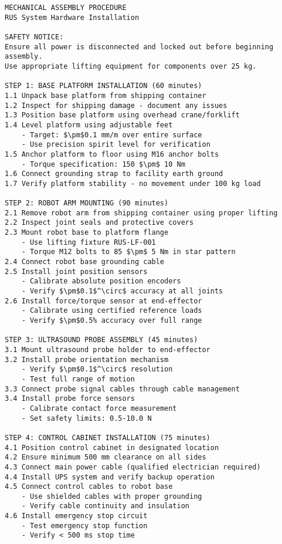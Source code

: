 \begin{lstlisting}[basicstyle=\ttfamily\footnotesize, caption={Step-by-Step Mechanical Assembly}, label={lst:app-mechanical}]
MECHANICAL ASSEMBLY PROCEDURE
RUS System Hardware Installation

SAFETY NOTICE: 
Ensure all power is disconnected and locked out before beginning assembly.
Use appropriate lifting equipment for components over 25 kg.

STEP 1: BASE PLATFORM INSTALLATION (60 minutes)
1.1 Unpack base platform from shipping container
1.2 Inspect for shipping damage - document any issues
1.3 Position base platform using overhead crane/forklift
1.4 Level platform using adjustable feet
    - Target: $\pm$0.1 mm/m over entire surface
    - Use precision spirit level for verification
1.5 Anchor platform to floor using M16 anchor bolts
    - Torque specification: 150 $\pm$ 10 Nm
1.6 Connect grounding strap to facility earth ground
1.7 Verify platform stability - no movement under 100 kg load

STEP 2: ROBOT ARM MOUNTING (90 minutes)
2.1 Remove robot arm from shipping container using proper lifting
2.2 Inspect joint seals and protective covers
2.3 Mount robot base to platform flange
    - Use lifting fixture RUS-LF-001
    - Torque M12 bolts to 85 $\pm$ 5 Nm in star pattern
2.4 Connect robot base grounding cable
2.5 Install joint position sensors
    - Calibrate absolute position encoders
    - Verify $\pm$0.1$^\circ$ accuracy at all joints
2.6 Install force/torque sensor at end-effector
    - Calibrate using certified reference loads
    - Verify $\pm$0.5% accuracy over full range

STEP 3: ULTRASOUND PROBE ASSEMBLY (45 minutes)
3.1 Mount ultrasound probe holder to end-effector
3.2 Install probe orientation mechanism
    - Verify $\pm$0.1$^\circ$ resolution
    - Test full range of motion
3.3 Connect probe signal cables through cable management
3.4 Install probe force sensors
    - Calibrate contact force measurement
    - Set safety limits: 0.5-10.0 N

STEP 4: CONTROL CABINET INSTALLATION (75 minutes)
4.1 Position control cabinet in designated location
4.2 Ensure minimum 500 mm clearance on all sides
4.3 Connect main power cable (qualified electrician required)
4.4 Install UPS system and verify backup operation
4.5 Connect control cables to robot base
    - Use shielded cables with proper grounding
    - Verify cable continuity and insulation
4.6 Install emergency stop circuit
    - Test emergency stop function
    - Verify < 500 ms stop time


\end{lstlisting}
